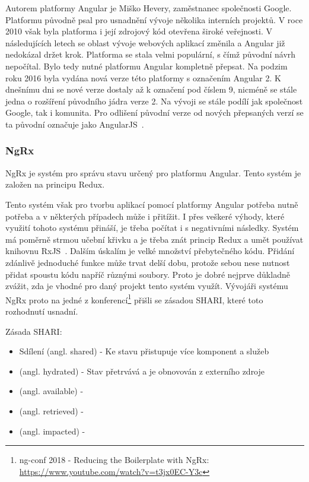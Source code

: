 Autorem platformy Angular je Miško Hevery, zaměstnanec společnosti Google. Platformu původně psal pro usnadnění vývoje několika interních projektů. V roce 2010 však byla platforma i její zdrojový kód otevřena široké veřejnosti. V následujících letech se oblast vývoje webových aplikací změnila a Angular již nedokázal držet krok. Platforma se stala velmi populární, s čímž původní návrh nepočítal. Bylo tedy nutné platformu Angular kompletně přepsat. Na podzim roku 2016 byla vydána nová verze této platformy s označením Angular 2. K dnešnímu dni se nové verze dostaly až k označení pod číslem 9, nicméně se stále jedna o rozšíření původního jádra verze 2. Na vývoji se stále podílí jak společnost Google, tak i komunita. Pro odlišení původní verze od nových přepsaných verzí se ta původní označuje jako AngularJS~\cite{bib:angular-history}.

\subsubsection{NgRx}
NgRx je systém pro správu stavu určený pro platformu Angular. Tento systém je založen na principu Redux.
\blindtext %

Tento systém však pro tvorbu aplikací pomocí platformy Angular potřeba nutně potřeba a v některých případech může i přitížit. I přes veškeré výhody, které využití tohoto systému přináší, je třeba počítat i s negativními následky. Systém má poměrně strmou učební křivku a je třeba znát princip Redux a umět používat knihovnu RxJS~\cite{bib:ngrx-docs}.
Dalším úskalím je velké množství přebytečného kódu. Přidání zdánlivě jednoduché funkce může trvat delší dobu, protože sebou nese nutnost přidat spoustu kódu napříč různými soubory. Proto je dobré nejprve důkladně zvážit, zda je vhodné pro daný projekt tento systém využít. Vývojáři systému NgRx proto na jedné z konferencí\footnote {ng-conf 2018 - Reducing the Boilerplate with NgRx: \url{https://www.youtube.com/watch?v=t3jx0EC-Y3c}} přišli se zásadou SHARI, které toto rozhodnutí usnadní. 

Zásada SHARI:
\begin{itemize}
  \item Sdílení (angl. shared) - Ke stavu přistupuje více komponent a služeb
  \item (angl. hydrated) - Stav přetrvává a je obnovován z externího zdroje
  \item (angl. available) - 
  \item (angl. retrieved) - 
  \item (angl. impacted) - 
\end{itemize}

